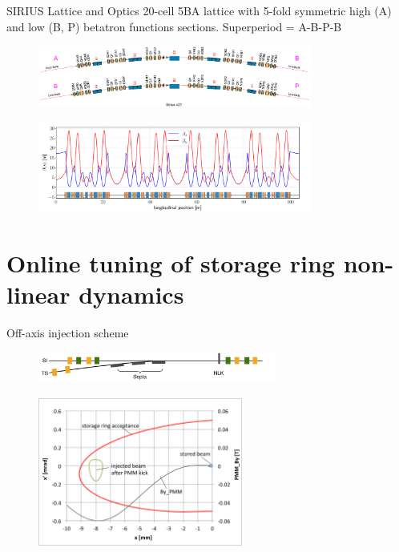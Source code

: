 \documentclass[aspectratio=169]{beamer}
\begin{document}
\begin{frame}{SIRIUS Lattice and Optics}
    20-cell 5BA lattice with 5-fold symmetric high (A) and low (B, P) betatron functions sections. Superperiod = A-B-P-B
    \begin{figure}
        \centering
        \includegraphics[width=0.8\textwidth]{SI_superperiod.png}
    \end{figure}
    \begin{figure}
        \includegraphics[width=0.8\textwidth]{beta_functions.pdf}
    \end{figure}
\end{frame}

\section{Online tuning of storage ring non-linear dynamics}
\begin{frame}{Off-axis injection scheme}
    \begin{figure}
        \centering
        \includegraphics[width=0.7\textwidth]{injection.pdf}
    \end{figure}
    \begin{figure}
        \centering
        \includegraphics[width=0.6\textwidth]{nlk_phase_space.png}
    \end{figure}
\end{frame}
\end{document}

